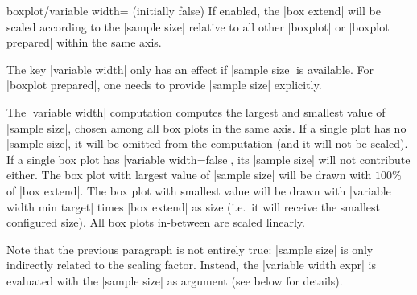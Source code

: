 \begin{pgfplotskey}{boxplot/variable width= (initially false)}
	If enabled, the |box extend| will be scaled according to the |sample size| relative to all other |boxplot| or |boxplot prepared| within the same axis.

	The key |variable width| only has an effect if |sample size| is available. For |boxplot prepared|, one needs to provide |sample size| explicitly.
\begin{codeexample}[]
\end{codeexample}

	The |variable width| computation computes the largest and smallest value of |sample size|, chosen among all box plots in the same axis. If a single plot has no |sample size|, it will be omitted from the computation (and it will not be scaled). If a single box plot has |variable width=false|, its |sample size| will not contribute either. The box plot with largest value of |sample size| will be drawn with $100\%$ of |box extend|. The box plot with smallest value will be drawn with |variable width min target| times |box extend| as size (i.e.\ it will receive the smallest configured size). All box plots in-between are scaled linearly.

	Note that the previous paragraph is not entirely true: |sample size| is only indirectly related to the scaling factor. Instead, the |variable width expr| is evaluated with the |sample size| as argument (see below for details).
\end{pgfplotskey}

